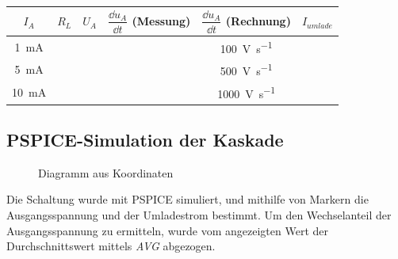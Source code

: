 \documentclass[
12pt,
a4paper,
headings=small,                    %
bibliography=totoc,                %
listof=totoc,                      %
parskip=half*,                     %
]{scrartcl}                        %
\renewcommand{\arraystretch}{1.15}
\newcommand{\laborsubsection}[2] {
    \renewcommand{\thesubsection}{#1 \thesection.\arabic{subsection}}
    \subsection{#2}
    \renewcommand{\thesubsection}{\thesection.\arabic{subsection}}
}
\newcommand{\resetlaborsectioncounter}{\setcounter{subsection}{0}}
\begin{document}
\begin{table}[H]
    \centering
    \renewcommand{\arraystretch}{2} %
    \setlength{\tabcolsep}{1.3em} %
    \begin{tabular}{|c|c|c|c|c|c|}
        \hline
        $I_A$                  & $R_L $ & $U_A$ & $\dfrac{\dd{u_A}}{\dd{t}}$ (Messung) & $\dfrac{\dd{u_A}}{\dd{t}}$ (Rechnung) & $I_{umlade}$ \\ \hline
        \SI{1}{\milli\ampere}  &        &       &                                      & \SI{100}{\volt\per\second}            &              \\ \hline
        \SI{5}{\milli\ampere}  &        &       &                                      & \SI{500}{\volt\per\second}            &              \\ \hline
        \SI{10}{\milli\ampere} &        &       &                                      & \SI{1000}{\volt\per\second}           &              \\ \hline
    \end{tabular}
\end{table}

\resetlaborsectioncounter
\laborsubsection{D}{PSPICE-Simulation der Kaskade}
\begin{figure}
    \centering
    \caption{Diagramm aus Koordinaten}
    \label{fig:2_2_diagramm}
\end{figure}
Die Schaltung wurde mit PSPICE simuliert, und mithilfe von Markern die Ausgangsspannung und der Umladestrom bestimmt. Um den Wechselanteil der Ausgangsspannung zu ermitteln, wurde vom angezeigten Wert der Durchschnittswert mittels \textit{AVG} abgezogen.
\end{document}

